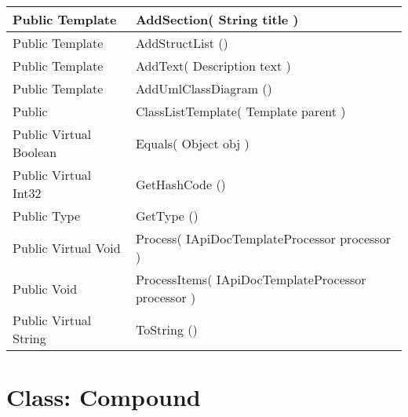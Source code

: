 \documentclass[11pt, oneside, a4paper]{book}
\begin{document}
\begin{center}
\begin{tabular}{| p{3cm} | p{12cm} | }
\hline
 Public  Template &  AddSection(\hypertarget{SoftwareEngineeringTools.{}Documentation.{}ClassListTemplate.{}AddSection\_String}{} String  title  )\\
\hline
 Public  Template &  AddStructList ()\hypertarget{SoftwareEngineeringTools.{}Documentation.{}ClassListTemplate.{}AddStructList}{}\\
\hline
 Public  Template &  AddText(\hypertarget{SoftwareEngineeringTools.{}Documentation.{}ClassListTemplate.{}AddText\_Description}{} Description  text  )\\
\hline
 Public  Template &  AddUmlClassDiagram ()\hypertarget{SoftwareEngineeringTools.{}Documentation.{}ClassListTemplate.{}AddUmlClassDiagram}{}\\
\hline
 Public  &  ClassListTemplate(\hypertarget{SoftwareEngineeringTools.{}Documentation.{}ClassListTemplate.{}ClassListTemplate\_Template}{} Template  parent  )\\
\hline
 Public  Virtual  Boolean &  Equals(\hypertarget{SoftwareEngineeringTools.{}Documentation.{}ClassListTemplate.{}Equals\_Object}{} Object  obj  )\\
\hline
 Public  Virtual  Int32 &  GetHashCode ()\hypertarget{SoftwareEngineeringTools.{}Documentation.{}ClassListTemplate.{}GetHashCode}{}\\
\hline
 Public  Type &  GetType ()\hypertarget{SoftwareEngineeringTools.{}Documentation.{}ClassListTemplate.{}GetType}{}\\
\hline
 Public  Virtual  Void &  Process(\hypertarget{SoftwareEngineeringTools.{}Documentation.{}ClassListTemplate.{}Process\_IApiDocTemplateProcessor}{} IApiDocTemplateProcessor  processor  )\\
\hline
 Public  Void &  ProcessItems(\hypertarget{SoftwareEngineeringTools.{}Documentation.{}ClassListTemplate.{}ProcessItems\_IApiDocTemplateProcessor}{} IApiDocTemplateProcessor  processor  )\\
\hline
 Public  Virtual  String &  ToString ()\hypertarget{SoftwareEngineeringTools.{}Documentation.{}ClassListTemplate.{}ToString}{}\\
\hline
\end{tabular}
\end{center}
 


\hypertarget{SoftwareEngineeringTools.{}Documentation.{}Compound}{}
\section{Class: Compound}
\end{document}
